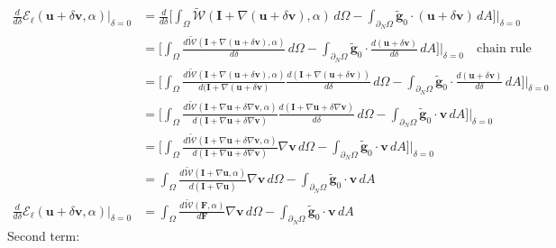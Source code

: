 \documentclass[12pt,3p]{article}
\numberwithin{equation}{section}
\begin{document}
\begin{align*}
\frac{d}{d \delta} \mathcal{E}_\ell (\bm{u} + \delta \bm{v}, \alpha) \big\rvert_{\delta = 0} 
	&= \frac{d}{d \delta} \bigg[ \int_\Omega  \widetilde{\mathcal{W}}(\mathbf{I} + \nabla (\bm{u} + \delta \bm{v}),\alpha)\,  d\Omega - \int_{\partial_N\Omega} {\tilde{\bm{g}}}_0 \cdot (\bm{u} + \delta \bm{v}) \, dA \bigg] \bigg\rvert_{\delta = 0}\\
	&= \bigg[ \int_\Omega \frac{d \widetilde{\mathcal{W}}(\mathbf{I} + \nabla (\bm{u} + \delta \bm{v}),\alpha)}{d \delta} \, d\Omega -  \int_{\partial_N\Omega} {\tilde{\bm{g}}}_0 \cdot \frac{d(\bm{u} + \delta \bm{v})}{d \delta} \, dA \bigg] \bigg\rvert_{\delta = 0} \quad \text{chain rule} \\
	&= \bigg[ \int_\Omega \frac{d \widetilde{\mathcal{W}}(\mathbf{I} + \nabla (\bm{u} + \delta \bm{v}),\alpha)}{d (\mathbf{I} + \nabla (\bm{u} + \delta \bm{v})} \frac{d (\mathbf{I} + \nabla (\bm{u} + \delta \bm{v}))}{d \delta} \, d\Omega -  \int_{\partial_N\Omega} {\tilde{\bm{g}}}_0 \cdot \frac{d(\bm{u} + \delta \bm{v})}{d \delta} \, dA \bigg] \bigg\rvert_{\delta = 0}\\
	&= \bigg[ \int_\Omega \frac{d \widetilde{\mathcal{W}}(\mathbf{I} + \nabla \bm{u} + \delta \nabla \bm{v}, \alpha)}{d (\mathbf{I} + \nabla \bm{u} + \delta \nabla \bm{v})} \frac{d (\mathbf{I} + \nabla \bm{u} + \delta \nabla \bm{v})}{d \delta} \, d\Omega -  \int_{\partial_N\Omega} {\tilde{\bm{g}}}_0 \cdot \bm{v} \, dA \bigg] \bigg\rvert_{\delta = 0}\\
	&= \bigg[ \int_\Omega \frac{d \widetilde{\mathcal{W}}(\mathbf{I} + \nabla \bm{u} + \delta \nabla \bm{v}, \alpha)}{d (\mathbf{I} + \nabla \bm{u} + \delta \nabla \bm{v})} \nabla \bm{v} \, d\Omega -  \int_{\partial_N\Omega} {\tilde{\bm{g}}}_0 \cdot \bm{v} \, dA \bigg] \bigg\rvert_{\delta = 0} \\
	&= \int_\Omega \frac{d \widetilde{\mathcal{W}}(\mathbf{I} + \nabla \bm{u}, \alpha)}{d (\mathbf{I} + \nabla \bm{u})} \nabla \bm{v} \, d\Omega -  \int_{\partial_N\Omega} {\tilde{\bm{g}}}_0 \cdot \bm{v} \, dA \\
\frac{d}{d \delta} \mathcal{E}_\ell (\bm{u} + \delta \bm{v}, \alpha) \big\rvert_{\delta = 0} 
	&= \int_\Omega \frac{d \widetilde{\mathcal{W}}(\mathbf{F}, \alpha)}{d \mathbf{F}} \nabla \bm{v} \, d\Omega -  \int_{\partial_N\Omega} {\tilde{\bm{g}}}_0 \cdot \bm{v} \, dA 
\end{align*}
Second term: 
\end{document}
